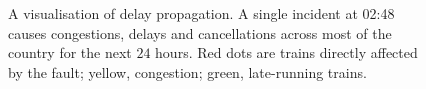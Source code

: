 \documentclass[12pt,a4paper]{article}
\begin{document}
\begin{figure}[h!]
    \centering
    \quad
    \quad
    \quad
    \caption{A visualisation of delay propagation. A single incident at 02:48 causes congestions, delays and cancellations across most of the country for the next $24$ hours. Red dots are trains directly affected by the fault; yellow, congestion; green, late-running trains.}
    \label{fig:delay_propagation}
\end{figure}
\end{document}
